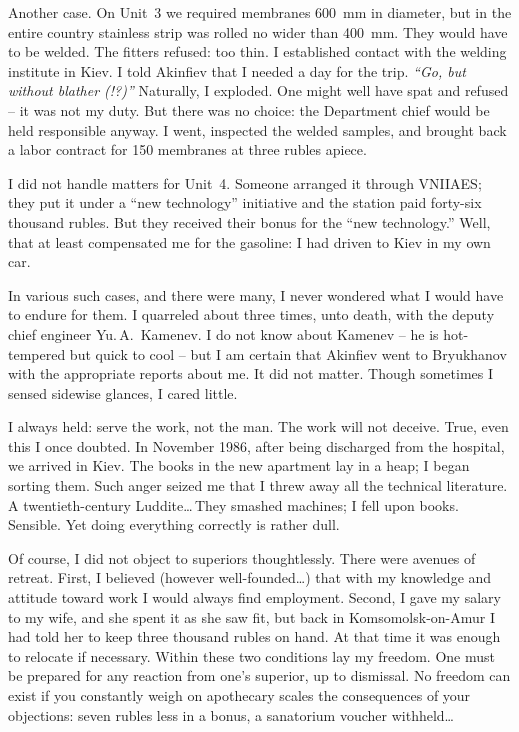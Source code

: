 \documentclass[openright]{bookest}
\begin{document}
Another case. On Unit~3 we required membranes \qty{600}{\milli\metre} in diameter, but in the entire country stainless strip was rolled no wider than \qty{400}{\milli\metre}. They would have to be welded. The fitters refused: too thin. I established contact with the welding institute in Kiev. I told Akinfiev that I needed a day for the trip. \textit{``Go, but without blather (!?)''} Naturally, I exploded. One might well have spat and refused -- it was not my duty. But there was no choice: the Department chief would be held responsible anyway. I went, inspected the welded samples, and brought back a labor contract for \num{150} membranes at three rubles apiece.

I did not handle matters for Unit~4. Someone arranged it through VNIIAES; they put it under a ``new technology'' initiative and the station paid forty-six thousand rubles. But they received their bonus for the ``new technology.'' Well, that at least compensated me for the gasoline: I had driven to Kiev in my own car.

In various such cases, and there were many, I never wondered what I would have to endure for them. I quarreled about three times, unto death, with the deputy chief engineer Yu.\,A.~Kamenev. I do not know about Kamenev -- he is hot-tempered but quick to cool -- but I am certain that Akinfiev went to Bryukhanov with the appropriate reports about me. It did not matter. Though sometimes I sensed sidewise glances, I cared little.

I always held: serve the work, not the man. The work will not deceive. True, even this I once doubted. In November 1986, after being discharged from the hospital, we arrived in Kiev. The books in the new apartment lay in a heap; I began sorting them. Such anger seized me that I threw away all the technical literature. A twentieth-century Luddite\ldots\,They smashed machines; I fell upon books. Sensible. Yet doing everything correctly is rather dull.

Of course, I did not object to superiors thoughtlessly. There were avenues of retreat. First, I believed (however well-founded\ldots) that with my knowledge and attitude toward work I would always find employment. Second, I gave my salary to my wife, and she spent it as she saw fit, but back in Komsomolsk-on-Amur I had told her to keep three thousand rubles on hand. At that time it was enough to relocate if necessary. Within these two conditions lay my freedom. One must be prepared for any reaction from one's superior, up to dismissal. No freedom can exist if you constantly weigh on apothecary scales the consequences of your objections: seven rubles less in a bonus, a sanatorium voucher withheld\ldots
\end{document}
